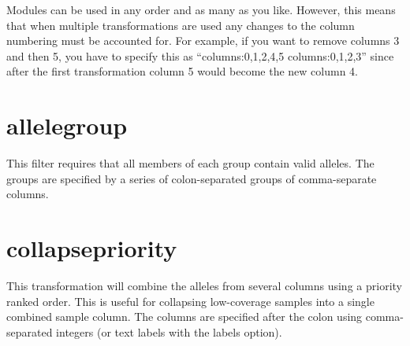 \documentclass[letterpaper,11pt,english]{sphinxmanual}
\begin{document}
Modules can be used in any order and as many as you like.  However,
this means that when multiple transformations are used any changes
to the column numbering must be accounted for.  For example,
if you want to remove columns 3 and then 5, you have to specify this as
“columns:0,1,2,4,5 columns:0,1,2,3” since after the first
transformation column 5 would become the new column 4.


\section{allelegroup}
\label{\detokenize{mvf_filter_modules:allelegroup}}
This filter requires that all members of each group contain
valid alleles.  The groups are specified by a series of colon-separated
groups of comma-separate columns.

%
\begin{sphinxVerbatim}[commandchars=\\\{\}]
  
 
 
 
\end{sphinxVerbatim}


\section{collapsepriority}
\label{\detokenize{mvf_filter_modules:collapsepriority}}
This transformation will combine the alleles from several
columns using a priority ranked order. This is useful for collapsing
low-coverage samples into a single combined sample column.
The columns  are specified after the colon using comma-separated integers
(or text labels with the \textendash{}labels option).

%
\begin{sphinxVerbatim}[commandchars=\\\{\}]
  
 
 
 
\end{sphinxVerbatim}
\end{document}
